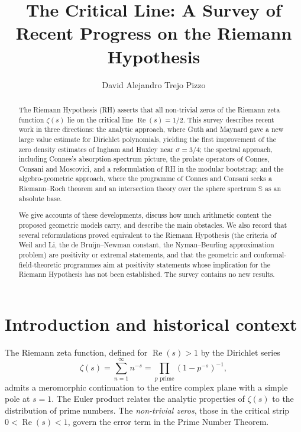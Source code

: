 \documentclass[11pt]{amsart}
\title[The Critical Line: A Survey]{The Critical Line: A Survey of Recent Progress on the Riemann Hypothesis}
\author{David Alejandro Trejo Pizzo}
\theoremstyle{definition}
\theoremstyle{remark}
\begin{document}
\begin{abstract}
The Riemann Hypothesis (RH) asserts that all non-trivial zeros of the Riemann zeta function $\zeta(s)$ lie on the critical line $\operatorname{Re}(s) = 1/2$. This survey describes recent work in three directions: the analytic approach, where Guth and Maynard gave a new large value estimate for Dirichlet polynomials, yielding the first improvement of the zero density estimates of Ingham and Huxley near $\sigma = 3/4$; the spectral approach, including Connes's absorption-spectrum picture, the prolate operators of Connes, Consani and Moscovici, and a reformulation of RH in the modular bootstrap; and the algebro-geometric approach, where the programme of Connes and Consani seeks a Riemann--Roch theorem and an intersection theory over the sphere spectrum $\mathbb{S}$ as an absolute base.

We give accounts of these developments, discuss how much arithmetic content the proposed geometric models carry, and describe the main obstacles. We also record that several reformulations proved equivalent to the Riemann Hypothesis (the criteria of Weil and Li, the de Bruijn--Newman constant, the Nyman--Beurling approximation problem) are positivity or extremal statements, and that the geometric and conformal-field-theoretic programmes aim at positivity statements whose implication for the Riemann Hypothesis has not been established. The survey contains no new results.
\end{abstract}
\maketitle

\tableofcontents
\newpage

\section{Introduction and historical context}\label{sec:intro}

The Riemann zeta function, defined for $\operatorname{Re}(s) > 1$ by the Dirichlet series
\[
\zeta(s) = \sum_{n=1}^{\infty} n^{-s} = \prod_{p \text{ prime}} (1 - p^{-s})^{-1},
\]
admits a meromorphic continuation to the entire complex plane with a simple pole at $s = 1$. The Euler product relates the analytic properties of $\zeta(s)$ to the distribution of prime numbers. The \emph{non-trivial zeros}, those in the critical strip $0 < \operatorname{Re}(s) < 1$, govern the error term in the Prime Number Theorem.
\end{document}
